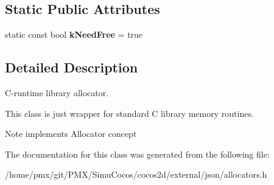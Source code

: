 \subsection*{Static Public Attributes}
\begin{DoxyCompactItemize}
\item 
\mbox{\label{classCrtAllocator_a5198c73448c0e8354435ec95d9d27eea}} 
static const bool {\bfseries k\+Need\+Free} = true
\end{DoxyCompactItemize}


\subsection{Detailed Description}
C-\/runtime library allocator. 

This class is just wrapper for standard C library memory routines. \begin{DoxyNote}{Note}
implements Allocator concept 
\end{DoxyNote}


The documentation for this class was generated from the following file\+:\begin{DoxyCompactItemize}
\item 
/home/pmx/git/\+P\+M\+X/\+Simu\+Cocos/cocos2d/external/json/allocators.\+h\end{DoxyCompactItemize}
